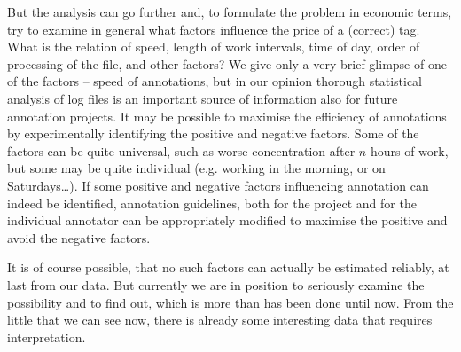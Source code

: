 But the analysis can go further and, to formulate the problem in economic terms, try to examine in general what factors influence the price of a (correct) tag. What is the relation of speed, length of work intervals, time of day, order of processing of the file, and other factors? We give only a very brief glimpse of one of the factors -- speed of annotations, but in our opinion thorough statistical analysis of log files is an important source of information also for future annotation projects. It may be possible to maximise the efficiency of annotations by experimentally identifying the positive and negative factors. Some of the factors can be quite universal, such as worse concentration after $n$ hours of work, but some may be quite individual (e.g. working in the morning, or on Saturdays\ldots). If some positive and negative factors influencing annotation can indeed be identified, annotation guidelines, both for the project and for the individual annotator can be appropriately modified to maximise the positive and avoid the negative factors.

It is of course possible, that no such factors can actually be estimated reliably, at last from our data. But currently we are in position to seriously examine the possibility and to find out, which is more than has been done until now. From the little that we can see now, there is already some interesting data that requires interpretation.
